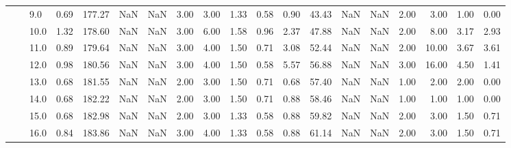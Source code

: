 \begin{tabular}{lllrrrrrrrrrrrrrrrr}
       &     & 9.0  &      0.69 &     177.27 &               NaN &                NaN &  3.00 &   3.00 &             1.33 &                         0.58 &      0.90 &      43.43 &               NaN &                NaN &  2.00 &   3.00 &             1.00 &                         0.00 \\
       &     & 10.0 &      1.32 &     178.60 &               NaN &                NaN &  3.00 &   6.00 &             1.58 &                         0.96 &      2.37 &      47.88 &               NaN &                NaN &  2.00 &   8.00 &             3.17 &                         2.93 \\
       &     & 11.0 &      0.89 &     179.64 &               NaN &                NaN &  3.00 &   4.00 &             1.50 &                         0.71 &      3.08 &      52.44 &               NaN &                NaN &  2.00 &  10.00 &             3.67 &                         3.61 \\
       &     & 12.0 &      0.98 &     180.56 &               NaN &                NaN &  3.00 &   4.00 &             1.50 &                         0.58 &      5.57 &      56.88 &               NaN &                NaN &  3.00 &  16.00 &             4.50 &                         1.41 \\
       &     & 13.0 &      0.68 &     181.55 &               NaN &                NaN &  2.00 &   3.00 &             1.50 &                         0.71 &      0.68 &      57.40 &               NaN &                NaN &  1.00 &   2.00 &             2.00 &                         0.00 \\
       &     & 14.0 &      0.68 &     182.22 &               NaN &                NaN &  2.00 &   3.00 &             1.50 &                         0.71 &      0.88 &      58.46 &               NaN &                NaN &  1.00 &   1.00 &             1.00 &                         0.00 \\
       &     & 15.0 &      0.68 &     182.98 &               NaN &                NaN &  2.00 &   3.00 &             1.33 &                         0.58 &      0.88 &      59.82 &               NaN &                NaN &  2.00 &   3.00 &             1.50 &                         0.71 \\
       &     & 16.0 &      0.84 &     183.86 &               NaN &                NaN &  3.00 &   4.00 &             1.33 &                         0.58 &      0.88 &      61.14 &               NaN &                NaN &  2.00 &   3.00 &             1.50 &                         0.71 \\

\end{tabular}
